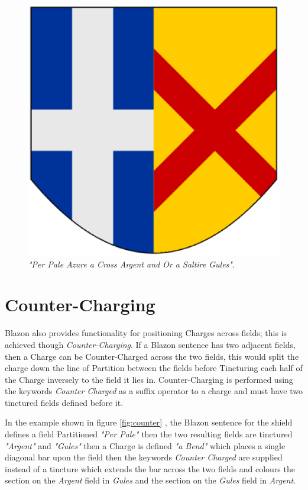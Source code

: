 
\begin{figure}[H]
  \centering
    \includegraphics[width=\textwidth]{Blazon/images/perpaleazureacrossargent.eps}
  \caption{\emph{"Per Pale Azure a Cross Argent and Or a Saltire Gules"}.}
  
\end{figure}

\section{Counter-Charging}

Blazon also provides functionality for positioning Charges across fields; this is achieved though \emph{Counter-Charging}.  If a Blazon sentence has two adjacent fields, then a Charge can be Counter-Charged across the two fields, this would split the charge down the line of Partition between the fields before Tincturing each half of the Charge inversely to the field it lies in.  Counter-Charging is performed using the keywords \emph{Counter Charged} as a suffix operator to a charge and must have two tinctured fields defined before it. 

In the example shown in figure \ref{fig:counter}
, the Blazon sentence for the shield defines a field Partitioned \emph{"Per Pale"} then the two resulting fields are tinctured \emph{"Argent"} and \emph{"Gules"} then a Charge is defined \emph{"a Bend"} which places a single diagonal bar upon the field then the keywords \emph{Counter Charged} are supplied instead of a tincture which extends the bar across the two fields and colours the section on the \emph{Argent} field in \emph{Gules} and the section on the \emph{Gules} field in \emph{Argent}.


